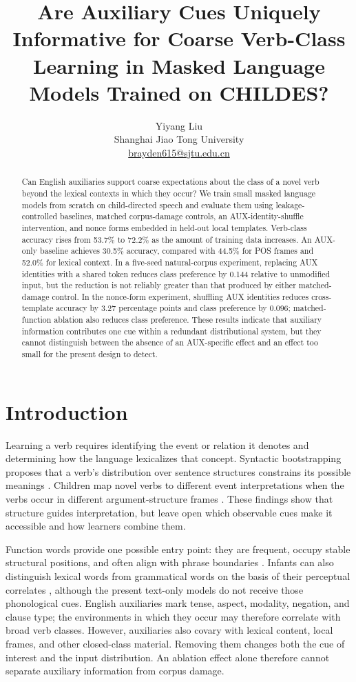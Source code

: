 \documentclass[11pt]{article}
\title{Are Auxiliary Cues Uniquely Informative for Coarse Verb-Class\\Learning in Masked Language Models Trained on CHILDES?}
\author{Yiyang Liu \\ 
  Shanghai Jiao Tong University \\
  \href{mailto:brayden615@sjtu.edu.cn}{brayden615@sjtu.edu.cn}}
\begin{document}
\maketitle

\begin{abstract}
Can English auxiliaries support coarse expectations about the class of a novel verb beyond the lexical contexts in which they occur? We train small masked language models from scratch on child-directed speech and evaluate them using leakage-controlled baselines, matched corpus-damage controls, an AUX-identity-shuffle intervention, and nonce forms embedded in held-out local templates. Verb-class accuracy rises from 53.7\% to 72.2\% as the amount of training data increases. An AUX-only baseline achieves 30.5\% accuracy, compared with 44.5\% for POS frames and 52.0\% for lexical context. In a five-seed natural-corpus experiment, replacing AUX identities with a shared token reduces class preference by 0.144 relative to unmodified input, but the reduction is not reliably greater than that produced by either matched-damage control. In the nonce-form experiment, shuffling AUX identities reduces cross-template accuracy by 3.27 percentage points and class preference by 0.096; matched-function ablation also reduces class preference. These results indicate that auxiliary information contributes one cue within a redundant distributional system, but they cannot distinguish between the absence of an AUX-specific effect and an effect too small for the present design to detect.
\end{abstract}

\section{Introduction}

Learning a verb requires identifying the event or relation it denotes and determining how the language lexicalizes that concept. Syntactic bootstrapping proposes that a verb's distribution over sentence structures constrains its possible meanings \citep{gleitman1990,fisher1991}. Children map novel verbs to different event interpretations when the verbs occur in different argument-structure frames \citep{naigles1990,fisher2010}. These findings show that structure guides interpretation, but leave open which observable cues make it accessible and how learners combine them.

Function words provide one possible entry point: they are frequent, occupy stable structural positions, and often align with phrase boundaries \citep{decarvalho2019,yang2026}. Infants can also distinguish lexical words from grammatical words on the basis of their perceptual correlates \citep{shi1999}, although the present text-only models do not receive those phonological cues. English auxiliaries mark tense, aspect, modality, negation, and clause type; the environments in which they occur may therefore correlate with broad verb classes. However, auxiliaries also covary with lexical content, local frames, and other closed-class material. Removing them changes both the cue of interest and the input distribution. An ablation effect alone therefore cannot separate auxiliary information from corpus damage.
\end{document}
